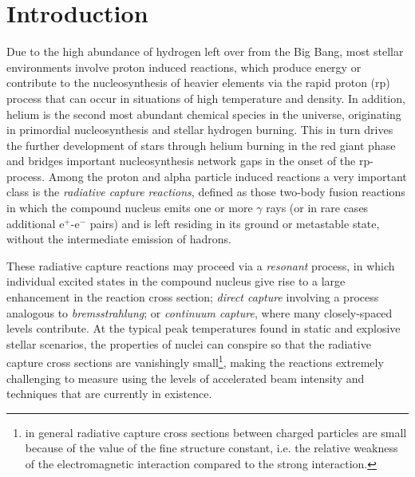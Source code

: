 \section{Introduction}
\label{intro}

Due to the high abundance of hydrogen left over from the Big Bang, most stellar environments involve proton induced reactions, which produce energy or contribute to the nucleosynthesis of heavier elements via the rapid proton (rp) process that can occur in situations of high temperature and density. In addition, helium is the second most abundant chemical species in the universe, originating in primordial nucleosynthesis and stellar hydrogen burning. This in turn drives the further development of stars through helium burning in the red giant phase and bridges important nucleosynthesis network gaps in the onset of the rp-process. Among the proton and alpha particle induced reactions a very important class is the {\em radiative capture reactions}, defined as those two-body fusion reactions in which the compound nucleus emits one or more $\gamma$ rays (or in rare cases additional e$^{+}$-e$^{-}$ pairs) and is left residing in its ground or metastable state, without the intermediate emission of hadrons. 

These radiative capture reactions may proceed via a {\em resonant} process, in which individual excited states in the compound nucleus give rise to a large enhancement in the reaction cross section; {\em direct capture} involving a process analogous to {\em bremsstrahlung}; or {\em continuum capture}, where many closely-spaced levels contribute. At the typical peak temperatures found in static and explosive stellar scenarios, the properties of nuclei can conspire so that the radiative capture cross sections are vanishingly small\footnote{in general radiative capture cross sections between charged particles are small because of the value of the fine structure constant, i.e. the relative weakness of the electromagnetic interaction compared to the strong interaction.}, making the reactions extremely challenging to measure using the levels of accelerated beam intensity and techniques that are currently in existence. 

